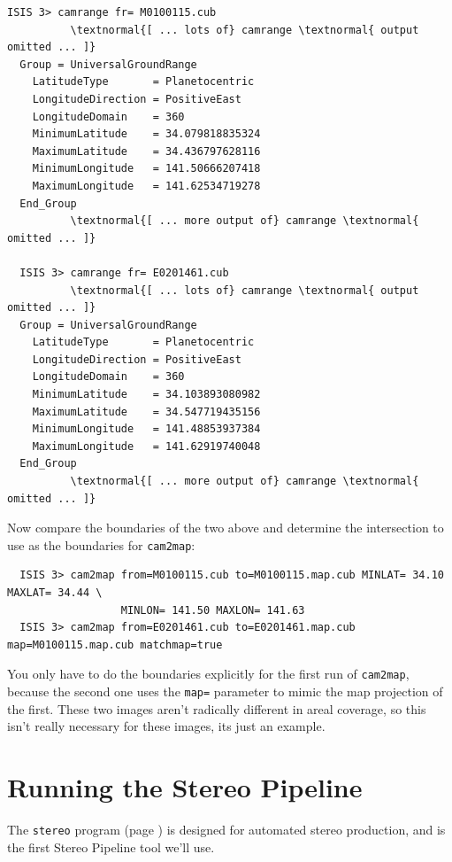 \begin{Verbatim}[commandchars=\\\{\}]
  ISIS 3> camrange fr= M0100115.cub
          \textnormal{[ ... lots of} camrange \textnormal{ output omitted ... ]}
  Group = UniversalGroundRange
    LatitudeType       = Planetocentric
    LongitudeDirection = PositiveEast
    LongitudeDomain    = 360
    MinimumLatitude    = 34.079818835324
    MaximumLatitude    = 34.436797628116
    MinimumLongitude   = 141.50666207418
    MaximumLongitude   = 141.62534719278
  End_Group
          \textnormal{[ ... more output of} camrange \textnormal{ omitted ... ]}

  ISIS 3> camrange fr= E0201461.cub
          \textnormal{[ ... lots of} camrange \textnormal{ output omitted ... ]}
  Group = UniversalGroundRange
    LatitudeType       = Planetocentric
    LongitudeDirection = PositiveEast
    LongitudeDomain    = 360
    MinimumLatitude    = 34.103893080982
    MaximumLatitude    = 34.547719435156
    MinimumLongitude   = 141.48853937384
    MaximumLongitude   = 141.62919740048
  End_Group
          \textnormal{[ ... more output of} camrange \textnormal{ omitted ... ]}
\end{Verbatim}

Now compare the boundaries of the two above and determine the intersection to use as the boundaries for \texttt{cam2map}:

\begin{Verbatim}
  ISIS 3> cam2map from=M0100115.cub to=M0100115.map.cub MINLAT= 34.10 MAXLAT= 34.44 \
                  MINLON= 141.50 MAXLON= 141.63
  ISIS 3> cam2map from=E0201461.cub to=E0201461.map.cub map=M0100115.map.cub matchmap=true
\end{Verbatim}

You only have to do the boundaries explicitly for the first run of
\texttt{cam2map}, because the second one uses the \texttt{map=}
parameter to mimic the map projection of the first.  These two
images aren't radically different in areal coverage, so this isn't
really necessary for these images, its just an example.

\vfill

\section{Running the Stereo Pipeline}

The \texttt{stereo} program (page \pageref{stereo}) is designed for
automated stereo production, and is the first Stereo Pipeline tool
we'll use.

